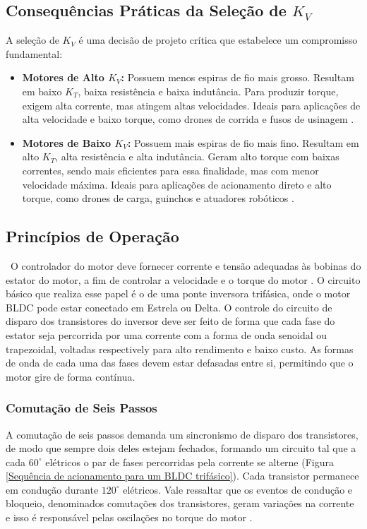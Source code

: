 \documentclass[12pt, a4paper, openright, oneside, brazilian]{abntex2}
\begin{document}
 \subsection{Consequências Práticas da Seleção de $K_V$} 

 A seleção de $K_V$ é uma decisão de projeto crítica que estabelece um compromisso fundamental: 
 \begin{itemize} 
 \item \textbf{Motores de Alto $K_V$:} Possuem menos espiras de fio mais grosso. Resultam em baixo $K_T$, baixa resistência e baixa indutância. Para produzir torque, exigem alta corrente, mas atingem altas velocidades. Ideais para aplicações de alta velocidade e baixo torque, como drones de corrida e fusos de usinagem \parencite{tmotor2019kv}. 
 \item \textbf{Motores de Baixo $K_V$:} Possuem mais espiras de fio mais fino. Resultam em alto $K_T$, alta resistência e alta indutância. Geram alto torque com baixas correntes, sendo mais eficientes para essa finalidade, mas com menor velocidade máxima. Ideais para aplicações de acionamento direto e alto torque, como drones de carga, guinchos e atuadores robóticos \parencite{byod2018kv}. 
 \end{itemize} 

 \subsection{Princípios de Operação} 

  O controlador do motor deve fornecer corrente e tensão adequadas às bobinas do estator do motor, a fim de controlar a velocidade e o torque do motor \cite{jahns1996pulsating}. O circuito básico que realiza esse papel é o de uma ponte inversora trifásica, onde o motor BLDC pode estar conectado em Estrela ou Delta. O controle do circuito de disparo dos transistores do inversor deve ser feito de forma que cada fase do estator seja percorrida por uma corrente com a forma de onda senoidal ou trapezoidal, voltadas respectively para alto rendimento e baixo custo. As formas de onda de cada uma das fases devem estar defasadas entre si, permitindo que o motor gire de forma contínua. 

 \subsubsection{Comutação de Seis Passos} 

 A comutação de seis passos demanda um sincronismo de disparo dos transistores, de modo que sempre dois deles estejam fechados, formando um circuito tal que a cada $60 ^\circ$ elétricos o par de fases percorridas pela corrente se alterne (Figura \ref{Sequência de acionamento para um BLDC trifásico}). Cada transistor permanece em condução durante $120 ^\circ$ elétricos. Vale ressaltar que os eventos de condução e bloqueio, denominados comutações dos transistores, geram variações na corrente e isso é responsável pelas oscilações no torque do motor \cite{kim2017electric}.  
\end{document}
